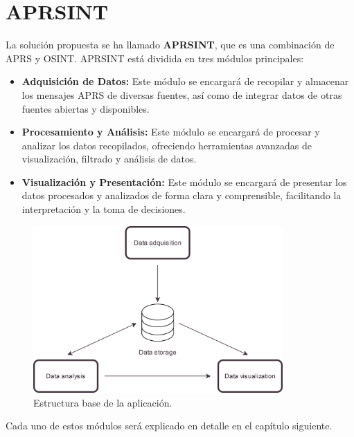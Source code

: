 \section{APRSINT}
La solución propuesta se ha llamado \textbf{APRSINT}, que es una combinación de APRS y OSINT. APRSINT está dividida en tres módulos principales:
\begin{itemize}
	\item \textbf{Adquisición de Datos:} Este módulo se encargará de recopilar y almacenar los mensajes APRS de diversas fuentes, así como de integrar datos de otras fuentes abiertas y disponibles.
	\item \textbf{Procesamiento y Análisis:} Este módulo se encargará de procesar y analizar los datos recopilados, ofreciendo herramientas avanzadas de visualización, filtrado y análisis de datos.
	\item \textbf{Visualización y Presentación:} Este módulo se encargará de presentar los datos procesados y analizados de forma clara y comprensible, facilitando la interpretación y la toma de decisiones.
\end{itemize}




\begin{figure}[h]
    \centering
    \includegraphics[width=0.85\textwidth]{Imagenes/Chapter_3/structure.png}
    \caption{Estructura base de la aplicación.}
    \label{fig:aprsint-logo}
\end{figure}

Cada uno de estos módulos será explicado en detalle en el capítulo siguiente.
